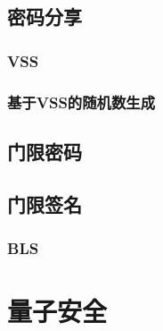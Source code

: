 \documentclass[UTF8]{ctexart}
\begin{document}
\subsection{密码分享}

\subsubsection{VSS}

\subsubsection{基于VSS的随机数生成}

\subsection{门限密码}

\subsection{门限签名}

\subsubsection{BLS}

\section{量子安全}

\ifx\allfiles\undefined
\end{document}
